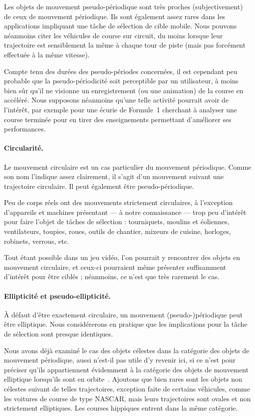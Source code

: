 	Les objets de mouvement pseudo-périodique sont très proches (subjectivement) de ceux de mouvement périodique. Ils sont également assez rares dans les applications impliquant une tâche de sélection de cible mobile. Nous pouvons néanmoins citer les véhicules de course sur circuit, du moins lorsque leur trajectoire est sensiblement la même à chaque tour de piste (mais pas forcément effectuée à la même vitesse).
	
	Compte tenu des durées des pseudo-périodes concernées, il est cependant peu probable que la pseudo-périodicité soit perceptible par un utilisateur, à moins bien sûr qu'il ne visionne un enregistrement (ou une animation) de la course en accéléré. Nous supposons néanmoins qu'une telle activité pourrait avoir de l'intérêt, par exemple pour une écurie de Formule~1 cherchant à analyser une course terminée pour en tirer des enseignements permettant d'améliorer ses performances.

	\paragraph{Circularité.}
	Le mouvement circulaire est un cas particulier du mouvement périodique. Comme son nom l'indique assez clairement, il s'agit d'un mouvement suivant une trajectoire circulaire. Il peut également être pseudo-périodique.
	
	Peu de corps réels ont des mouvements strictement circulaires, à l'exception d'appareils et machines présentant --- à notre connaissance --- trop peu d'intérêt pour faire l'objet de tâches de sélection : tourniquets, moulins et éoliennes, ventilateurs, toupies, roues, outils de chantier, mixeurs de cuisine, horloges, robinets, verrous, etc.
	
	Tout étant possible dans un jeu vidéo, l'on pourrait y rencontrer des objets en mouvement circulaire, et ceux-ci pourraient même présenter suffisamment d'intérêt pour être ciblés ; néanmoins, ce n'est que très rarement le cas.
	
	\paragraph{Ellipticité et pseudo-ellipticité.}
	À défaut d'être exactement circulaire, un mouvement (pseudo-)périodique peut être elliptique. Nous considérerons en pratique que les implications pour la tâche de sélection sont presque identiques.
	
	Nous avons déjà examiné le cas des objets célestes dans la catégorie des objets de mouvement périodique, aussi n'est-il pas utile d'y revenir ici, si ce n'est pour préciser qu'ils appartiennent évidemment à la catégorie des objets de mouvement elliptique lorsqu'ils sont en orbite~\cite{kepler1953epitome}. Ajoutons que bien rares sont les objets non célestes suivant de telles trajectoires, exception faite de certains véhicules, comme les voitures de course de type NASCAR, mais leurs trajectoires sont ovales et non strictement elliptiques. Les courses hippiques entrent dans la même catégorie.
	
